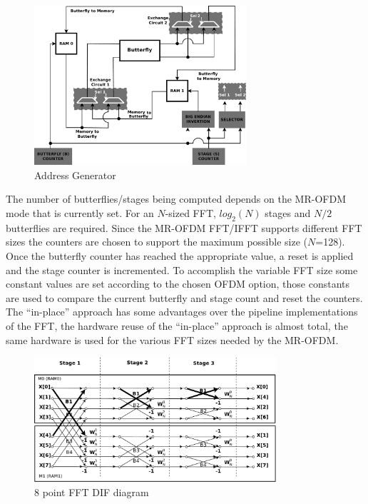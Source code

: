 \begin{figure}[htbp]
\centering
\includegraphics[width=0.7\textwidth]{./figures/arch_addr.pdf}
\caption{Address Generator}
\label{fig:Addr_gen}
\end{figure} 


The number of butterflies/stages being computed depends on the MR-OFDM mode that is currently set. For an $N$-sized FFT, $log_{2}(N)$ stages and $N/2$ butterflies are required. Since the MR-OFDM FFT/IFFT supports different FFT sizes the counters are chosen to support the maximum possible size ($N$=128). Once the butterfly counter has reached the appropriate value, a reset is applied and the stage counter is incremented. To accomplish the variable FFT size some constant values are set according to the chosen OFDM option, those constants are used to compare the current butterfly and stage count and reset the counters. The ``in-place''  approach has some advantages over the pipeline implementations of the FFT, the hardware reuse of the ``in-place'' approach is almost total, the same hardware is used for the various FFT sizes needed by the MR-OFDM.  

% 
\begin{figure}[htbp]
\centering
\includegraphics[width=0.8\textwidth]{./figures/Butfly_DIf_RAMs}
\caption{8 point FFT DIF diagram}
\label{fig:fft_dia_memories}
\end{figure} 


